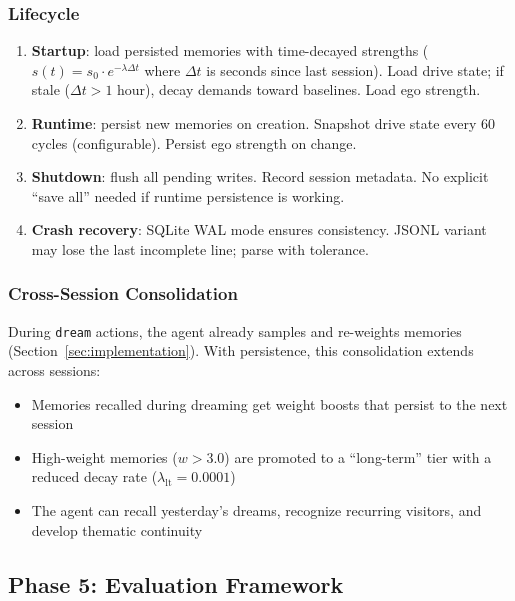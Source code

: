 \documentclass[11pt,oneside]{article}
\begin{document}
\subsubsection{Lifecycle}

\begin{enumerate}
  \item \textbf{Startup}: load persisted memories with time-decayed strengths ($s(t) = s_0 \cdot e^{-\lambda \Delta t}$ where $\Delta t$ is seconds since last session).
        Load drive state; if stale ($\Delta t > 1$ hour), decay demands toward baselines.
        Load ego strength.
  \item \textbf{Runtime}: persist new memories on creation.
        Snapshot drive state every 60 cycles (configurable).
        Persist ego strength on change.
  \item \textbf{Shutdown}: flush all pending writes.
        Record session metadata.
        No explicit ``save all'' needed if runtime persistence is working.
  \item \textbf{Crash recovery}: SQLite WAL mode ensures consistency.
        JSONL variant may lose the last incomplete line; parse with tolerance.
\end{enumerate}

\subsubsection{Cross-Session Consolidation}

During \texttt{dream} actions, the agent already samples and re-weights memories (Section~\ref{sec:implementation}).
With persistence, this consolidation extends across sessions:

\begin{itemize}
  \item Memories recalled during dreaming get weight boosts that persist to the next session
  \item High-weight memories ($w > 3.0$) are promoted to a ``long-term'' tier with a reduced decay rate ($\lambda_{\text{lt}} = 0.0001$)
  \item The agent can recall yesterday's dreams, recognize recurring visitors, and develop thematic continuity
\end{itemize}

\subsection{Phase 5: Evaluation Framework}
\end{document}
